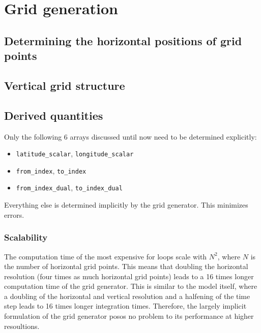 \documentclass[10pt]{report}
\begin{document}
\chapter{Grid generation}
\label{chap:grid_generation}

\section{Determining the horizontal positions of grid points}
\label{sec:determining_the_horizontal_positions_of_grid_points}

\section{Vertical grid structure}
\label{sec:vertical_grid_structure}

\section{Derived quantities}
\label{sec:derived_quantities}

Only the following 6 arrays discussed until now need to be determined explicitly:

\begin{itemize}
\item \texttt{latitude\_scalar}, \texttt{longitude\_scalar}
\item \texttt{from\_index}, \texttt{to\_index}
\item \texttt{from\_index\_dual}, \texttt{to\_index\_dual}
\end{itemize}
%
Everything else is determined implicitly by the grid generator. This minimizes errors.

\subsection{Scalability}
\label{sec:scalability}

The computation time of the most expensive for loops scale with $N^2$, where $N$ is the number of horizontal grid points. This means that doubling the horizontal resolution (four times as much horizontal grid points) leads to a 16 times longer computation time of the grid generator. This is similar to the model itself, where a doubling of the horizontal and vertical resolution and a halfening of the time step leads to 16 times longer integration times. Therefore, the largely implicit formulation of the grid generator posos no problem to its performance at higher resoultions.
\end{document}
